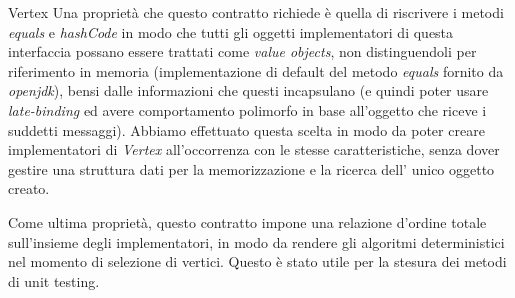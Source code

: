 \begin{paragraph}{Vertex}
  Una propriet\`a che questo contratto richiede \`e quella di
  riscrivere i metodi \emph{equals} e \emph{hashCode} in modo che
  tutti gli oggetti implementatori di questa interfaccia possano
  essere trattati come \emph{value objects}, non distinguendoli per
  riferimento in memoria (implementazione di default del metodo
  \emph{equals} fornito da \emph{openjdk}), bensi dalle informazioni
  che questi incapsulano (e quindi poter usare \emph{late-binding} ed
  avere comportamento polimorfo in base all'oggetto che riceve i
  suddetti messaggi). Abbiamo effettuato questa scelta in modo da
  poter creare implementatori di \emph{Vertex} all'occorrenza con le
  stesse caratteristiche, senza dover gestire una struttura dati per
  la memorizzazione e la ricerca dell' unico oggetto creato.

  Come ultima propriet\`a, questo contratto impone una relazione
  d'ordine totale sull'insieme degli implementatori, in modo da
  rendere gli algoritmi deterministici nel momento di selezione di
  vertici. Questo \`e stato utile per la stesura dei metodi di unit
  testing.

\end{paragraph}

